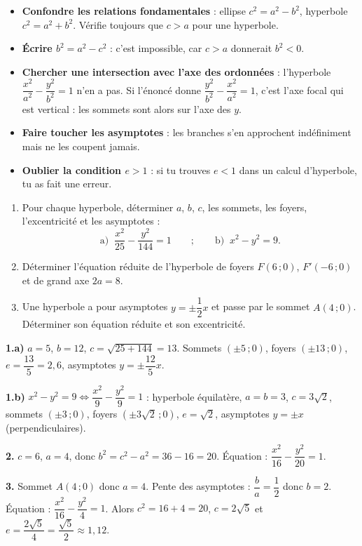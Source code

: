 \documentclass[11pt]{article}
\begin{document}
\begin{attention}
\begin{itemize}
\item \textbf{Confondre les relations fondamentales} : ellipse $c^2 = a^2 - b^2$, hyperbole $c^2 = a^2 + b^2$. Vérifie toujours que $c > a$ pour une hyperbole.
\item \textbf{Écrire $b^2 = a^2 - c^2$} : c'est impossible, car $c > a$ donnerait $b^2 < 0$.
\item \textbf{Chercher une intersection avec l'axe des ordonnées} : l'hyperbole $\dfrac{x^2}{a^2} - \dfrac{y^2}{b^2} = 1$ n'en a pas. Si l'énoncé donne $\dfrac{y^2}{b^2} - \dfrac{x^2}{a^2} = 1$, c'est l'axe focal qui est vertical : les sommets sont alors sur l'axe des $y$.
\item \textbf{Faire toucher les asymptotes} : les branches s'en approchent indéfiniment mais ne les coupent jamais.
\item \textbf{Oublier la condition $e > 1$} : si tu trouves $e < 1$ dans un calcul d'hyperbole, tu as fait une erreur.
\end{itemize}
\end{attention}

\begin{exercice}
\begin{enumerate}
\item Pour chaque hyperbole, déterminer $a$, $b$, $c$, les sommets, les foyers, l'excentricité et les asymptotes :
\[ \text{a) }\ \frac{x^2}{25} - \frac{y^2}{144} = 1 \qquad ; \qquad \text{b) }\ x^2 - y^2 = 9. \]
\item Déterminer l'équation réduite de l'hyperbole de foyers $F(6\,;0)$, $F'(-6\,;0)$ et de grand axe $2a = 8$.
\item Une hyperbole a pour asymptotes $y = \pm \dfrac{1}{2}x$ et passe par le sommet $A(4\,;0)$. Déterminer son équation réduite et son excentricité.
\end{enumerate}
\end{exercice}

\begin{corrige}[Exercice]
\textbf{1.a)} $a = 5$, $b = 12$, $c = \sqrt{25+144} = 13$. Sommets $(\pm 5\,;0)$, foyers $(\pm 13\,;0)$, $e = \dfrac{13}{5} = 2{,}6$, asymptotes $y = \pm \dfrac{12}{5}x$.

\textbf{1.b)} $x^2 - y^2 = 9 \Leftrightarrow \dfrac{x^2}{9} - \dfrac{y^2}{9} = 1$ : hyperbole équilatère, $a = b = 3$, $c = 3\sqrt{2}$, sommets $(\pm 3\,;0)$, foyers $(\pm 3\sqrt{2}\,;0)$, $e = \sqrt{2}$, asymptotes $y = \pm x$ (perpendiculaires).

\textbf{2.} $c = 6$, $a = 4$, donc $b^2 = c^2 - a^2 = 36 - 16 = 20$. Équation : $\dfrac{x^2}{16} - \dfrac{y^2}{20} = 1$.

\textbf{3.} Sommet $A(4\,;0)$ donc $a = 4$. Pente des asymptotes : $\dfrac{b}{a} = \dfrac{1}{2}$ donc $b = 2$. Équation : $\dfrac{x^2}{16} - \dfrac{y^2}{4} = 1$. Alors $c^2 = 16 + 4 = 20$, $c = 2\sqrt{5}$ et $e = \dfrac{2\sqrt{5}}{4} = \dfrac{\sqrt{5}}{2} \approx 1{,}12$.
\end{corrige}
\end{document}
